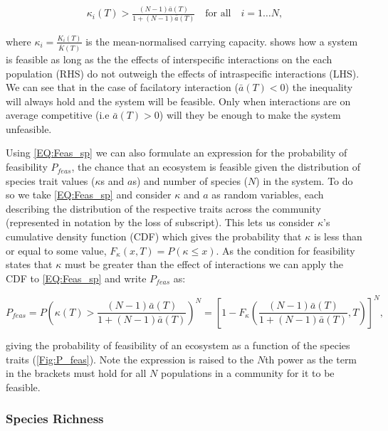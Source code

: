 \documentclass{article}
\begin{document}
\begin{align} \label{EQ:Feas_sp}
  \kappa_i(T) > \frac{(N-1)\bar{a}(T)}{1 + (N-1)\bar{a}(T)} \quad \text{for all} \quad i = 1 \ldots N,
\end{align}

where $\kappa_i = \frac{K_i(T)}{\bar{K}(T)}$ is the mean-normalised carrying capacity.  shows how a system is feasible as long as the the effects of interspecific interactions on the each population (RHS) do not outweigh the effects of intraspecific interactions (LHS). We can see that in the case of facilatory interaction ($\bar{a}(T) < 0$) the inequality will always hold and the system will be feasible. Only when interactions are on average competitive (i.e $\bar{a}(T) > 0$) will they be enough to make the system unfeasible. 

Using \cref{EQ:Feas_sp} we can also formulate an expression for the probability of feasibility $P_{feas}$, the chance that an ecosystem is feasible given the distribution of species trait values ($\kappa$s and $a$s) and number of species ($N$) in the system. To do so we take \cref{EQ:Feas_sp} and consider $\kappa$ and $a$ as random variables, each describing the distribution of the respective traits across the community (represented in notation by the loss of subscript). This lets us consider $\kappa$'s cumulative density function (CDF) which gives the probability that $\kappa$ is less than or equal to some value, $F_{\kappa}(x,T) = P(\kappa \leq x)$. As the condition for feasibility states that $\kappa$ must be greater than the effect of interactions we can apply the CDF to \cref{EQ:Feas_sp} and write $P_{feas}$ as:

\begin{equation} \label{EQ:P_feas}
    P_{feas} = P \left( \kappa(T) > \frac{(N-1)\bar{a}(T)}{1 + (N-1)\bar{a}(T)}  \right)^N = 
    \left[1 - F_{\kappa}\left(\frac{(N-1)\bar{a}(T)}{1 + (N-1)\bar{a}(T)},T \right)\right]^N,
\end{equation}

giving the probability of feasibility of an ecosystem as a function of the species traits (\cref{Fig:P_feas}). Note the expression is raised to the $N$th power as the term in the brackets must hold for all $N$ populations in a community for it to be feasible.

\subsubsection{Species Richness}
\end{document}
